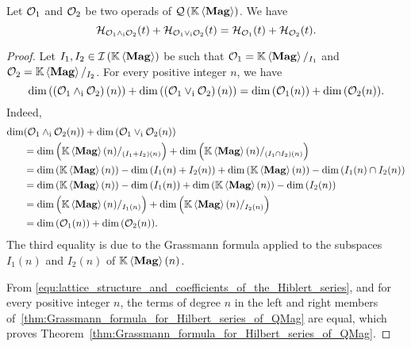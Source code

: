 \begin{Theorem}
    \label{thm:Grassmann_formula_for_Hilbert_series_of_QMag}
    Let $\mathcal{O}_1$ and $\mathcal{O}_2$ be two operads of $\mathcal{Q}\left(\mathbb{K} \left\langle\mathbf{Mag}\right\rangle\right)$. We have
    \begin{equation} \label{equ:lattice_structure_and_Hiblert_series}
        \mathcal{H}_{\mathcal{O}_1\wedge_{\mathrm{i}}\mathcal{O}_2}(t)
        +\mathcal{H}_{\mathcal{O}_1\vee_{\mathrm{i}}\mathcal{O}_2}(t)
        =\mathcal{H}_{\mathcal{O}_1}(t)+\mathcal{H}_{\mathcal{O}_2}(t).
    \end{equation}
\end{Theorem}
\begin{proof}
  Let $I_1, I_2 \in \mathcal{I}\left(\mathbb{K} \left\langle\mathbf{Mag}\right\rangle\right)$ be such that $\mathcal{O}_1 = \mathbb{K} \left\langle\mathbf{Mag}\right\rangle/_{I_1}$ and
    $\mathcal{O}_2 = \mathbb{K} \left\langle\mathbf{Mag}\right\rangle/_{I_2}$. For every positive integer $n$, we have
  \begin{equation}
    \label{equ:lattice_structure_and_coefficients_of_the_Hiblert_series}
        \dim{\left(\left(\mathcal{O}_1\wedge_{\mathrm{i}}\mathcal{O}_2\right)(n)\right)}+
        \dim{\left(\left(\mathcal{O}_1\vee_{\mathrm{i}}\mathcal{O}_2\right)(n)\right)}=
        \dim{\left(\mathcal{O}_1(n)\right)}+\dim{\left(\mathcal{O}_2(n)\right)}.
  \end{equation}
  Indeed,
    \begin{equation}\begin{split}
        \dim & {\left(\mathcal{O}_1\wedge_{\mathrm{i}}\mathcal{O}_2(n)\right)}+
            \dim{\left(\mathcal{O}_1\vee_{\mathrm{i}}\mathcal{O}_2(n)\right)}\\
        &=\dim{\Big(\mathbb{K}\left\langle\mathbf{Mag}\right\rangle(n)/_{\left(I_1+I_2\right)(n)}\Big)}+
            \dim{\Big(\mathbb{K}\left\langle\mathbf{Mag}\right\rangle(n)/_{\left(I_1\cap I_2\right)(n)}\Big)}\\
        &=\dim{\left(\mathbb{K}\left\langle\mathbf{Mag}\right\rangle(n)\right)}-\dim{\left(I_1(n)+I_2(n)\right)}
            +\dim{\left(\mathbb{K}\left\langle\mathbf{Mag}\right\rangle(n)\right)}
            -\dim{\left(I_1(n)\cap I_2(n)\right)} \\
        &=\dim{\left(\mathbb{K}\left\langle\mathbf{Mag}\right\rangle(n)\right)}-\dim{\left(I_1(n)\right)}
            + \dim{\left(\mathbb{K}\left\langle\mathbf{Mag}\right\rangle(n)\right)}-\dim{\left(I_2(n)\right)}\\
        &=\dim{\Big(\mathbb{K}\left\langle\mathbf{Mag}\right\rangle(n)/_{I_1(n)}\Big)}
            +\dim{\Big(\mathbb{K}\left\langle\mathbf{Mag}\right\rangle(n)/_{I_2(n)}\Big)}\\
        &=\dim{\left(\mathcal{O}_1(n)\right)}+\dim{\left(\mathcal{O}_2(n)\right)}.
    \end{split}\end{equation}
    The third equality is due to the Grassmann formula applied to the
    subspaces $I_1(n)$ and $I_2(n)$ of $\mathbb{K} \left\langle\mathbf{Mag}\right\rangle(n)$.
    \smallbreak

    From
    \eqref{equ:lattice_structure_and_coefficients_of_the_Hiblert_series},
    and for every positive integer $n$, the terms of degree $n$ in the
    left and right members
    of~\eqref{thm:Grassmann_formula_for_Hilbert_series_of_QMag} are
    equal, which proves
    Theorem~\ref{thm:Grassmann_formula_for_Hilbert_series_of_QMag}.
\end{proof}
\medbreak

